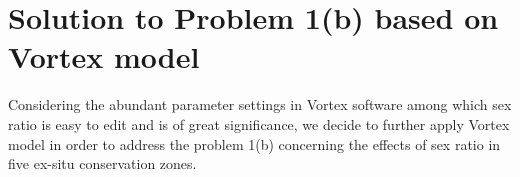 \documentclass{mcmthesis}
\numberwithin{figure}{section}
\numberwithin{table}{section}
\numberwithin{equation}{section}
\begin{document}
\begin{figure}[htbp]
  \centering
\end{figure}


 

\section{Solution to Problem 1(b) based on Vortex model}
Considering the abundant parameter settings in Vortex software among which sex ratio 
is easy to edit and is of great significance, we decide to further apply Vortex model
in order to address the problem 1(b) concerning the effects of sex ratio in five ex-situ
conservation zones.
\par
\end{document}
